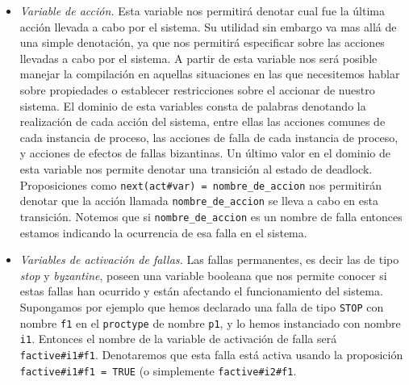 \documentclass[pdftex,a4paper,12pt]{book}
\begin{document}
\begin{itemize}
\item \textit{Variable de acci\'on.} Esta variable nos permitir\'a denotar cual fue la \'ultima acci\'on llevada a cabo por el sistema. Su utilidad sin embargo va mas all\'a de una simple denotaci\'on, ya que nos permitir\'a especificar sobre las acciones llevadas a cabo por el sistema. A partir de esta variable nos ser\'a posible manejar la compilaci\'on en aquellas situaciones en las que necesitemos hablar sobre propiedades o establecer restricciones sobre el accionar de nuestro sistema. El dominio de esta variables consta de palabras denotando la realizaci\'on de cada acci\'on del sistema, entre ellas las acciones comunes de cada instancia de proceso, las acciones de falla de cada instancia de proceso, y acciones de efectos de fallas bizantinas. Un \'ultimo valor en el dominio de esta variable nos permite denotar una transici\'on al estado de deadlock. Proposiciones como \texttt{next(act\#var) = nombre\_de\_accion} nos permitir\'an denotar que la acci\'on llamada \texttt{nombre\_de\_accion} se lleva a cabo en esta transici\'on. Notemos que si \texttt{nombre\_de\_accion} es un nombre de falla entonces estamos indicando la ocurrencia de esa falla en el sistema.

\item \textit{Variables de activaci\'on de fallas.} Las fallas permanentes, es decir las de tipo \textit{stop} y \textit{byzantine}, poseen una variable booleana que nos permite conocer si estas fallas han ocurrido y est\'an afectando el funcionamiento del sistema. Supongamos por ejemplo que hemos declarado una falla de tipo \texttt{STOP} con nombre \texttt{f1} en el \texttt{proctype} de nombre \texttt{p1}, y lo hemos instanciado con nombre \texttt{i1}. Entonces el nombre de la variable de activaci\'on de falla ser\'a \texttt{factive\#i1\#f1}. Denotaremos que esta falla est\'a activa usando la proposici\'on \texttt{factive\#i1\#f1 = TRUE} (o simplemente \texttt{factive\#i2\#f1}.


\end{itemize}
\end{document}
